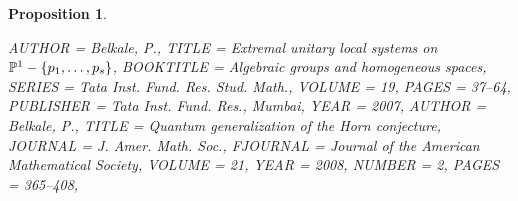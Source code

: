 \documentclass[11pt]{amsart}
\newtheorem{proposition}[theorem]{Proposition}
\numberwithin{theorem}{subsection}
\begin{document}
{\begin{proposition}
\begin{bibdiv}
\begin{biblist}
			

 {
    AUTHOR = {Belkale, P.},
     TITLE = {Extremal unitary local systems on {$\Bbb
              P^1-\{p_1,\dots,p_s\}$}},
 BOOKTITLE = {Algebraic groups and homogeneous spaces},
    SERIES = {Tata Inst. Fund. Res. Stud. Math.},
    VOLUME = {19},
     PAGES = {37--64},
 PUBLISHER = {Tata Inst. Fund. Res., Mumbai},
      YEAR = {2007},
}
 {
    AUTHOR = {Belkale, P.},
     TITLE = {Quantum generalization of the {H}orn conjecture},
   JOURNAL = {J. Amer. Math. Soc.},
  FJOURNAL = {Journal of the American Mathematical Society},
    VOLUME = {21},
      YEAR = {2008},
    NUMBER = {2},
     PAGES = {365--408},
}


\end{biblist}
\end{bibdiv}
\end{proposition}}
\end{document}
